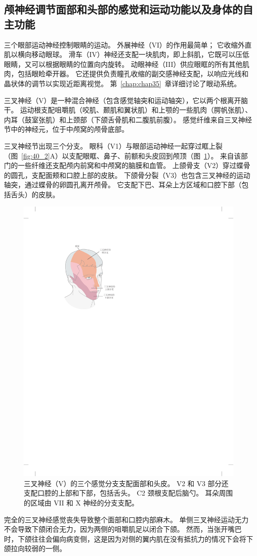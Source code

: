 \subsection{颅神经调节面部和头部的感觉和运动功能以及身体的自主功能}

三个眼部运动神经控制眼睛的运动。
外展神经（VI）的作用最简单；
它收缩外直肌以横向移动眼球。
滑车（IV）神经还支配一块肌肉，即上斜肌，它既可以压低眼睛，又可以根据眼睛的位置向内旋转。
动眼神经（III）供应眼眶的所有其他肌肉，包括眼睑牵开器。
它还提供负责瞳孔收缩的副交感神经支配，以响应光线和晶状体的调节以实现近距离视觉。
第~\ref{chap:chap35}~章详细讨论了眼动系统。


三叉神经（V）是一种混合神经（包含感觉轴突和运动轴突），它以两个根离开脑干。
运动根支配咀嚼肌（咬肌、颞肌和翼状肌）和上颚的一些肌肉（腭帆张肌）、内耳（鼓室张肌）和上颈部（下颌舌骨肌和二腹肌前腹）。
感觉纤维来自三叉神经节中的神经元，位于中颅窝的颅骨底部。


三叉神经节出现三个分支。
眼科（V1）与眼部运动神经一起穿过眶上裂（图~\ref{fig:40_2}A）以支配眼眶、鼻子、前额和头皮回到颅顶（图~\ref{fig:40_3}）。
来自该部门的一些纤维还支配颅内前窝和中颅窝的脑膜和血管。
上颌骨支（V2）穿过蝶骨的圆孔，支配面颊和口腔上部的皮肤。
下颌骨分裂（V3）也包含三叉神经的运动轴突，通过蝶骨的卵圆孔离开颅骨。
它支配下巴、耳朵上方区域和口腔下部（包括舌头）的皮肤。


\begin{figure}[htbp]
	\centering
	\includegraphics[width=0.44\linewidth]{chap40/fig_40_3}
	\caption{三叉神经（V）的三个感觉分支支配面部和头皮。
		V2 和 V3 部分还支配口腔的上部和下部，包括舌头。
		C2 颈根支配后脑勺。
		耳朵周围的区域由 VII 和 X 神经的分支支配。}
	\label{fig:40_3}
\end{figure}


完全的三叉神经感觉丧失导致整个面部和口腔内部麻木。
单侧三叉神经运动无力不会导致下颌闭合无力，因为两侧的咀嚼肌足以闭合下颌。
然而，当张开嘴巴时，下颌往往会偏向病变侧，这是因为对侧的翼内肌在没有抵抗力的情况下会将下颌拉向较弱的一侧。



